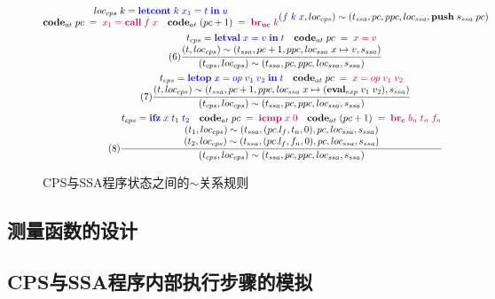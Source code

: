 \begin{figure}[htbp]
\begin{gather*}
{{\begin{matrix}
            loc_{cps}\; k = \textcolor{blue}{\mathbf{letcont}\; k\; x_1=t\; \mathbf{in}\; u}\\
            \mathbf{code}_{at}\; pc\; =\; \textcolor{purple}{x_1 = \mathbf{call}\; f\; x}\quad
            \mathbf{code}_{at}\; (pc+1)\; =\; \textcolor{purple}{\mathbf{br_{uc}}\; k} \end{matrix}}
            {(\textcolor{blue}{f\; k\; x},loc_{cps})\sim (t_{ssa},pc,ppc,loc_{ssa},\mathbf{push}\; s_{ssa}\; pc)}}  \\
        \tag{6} \displaystyle{\frac{\begin{matrix}
            t_{cps} = \textcolor{blue}{\mathbf{letval}\; x=v\; \mathbf{in}\; t} \quad
            \mathbf{code}_{at}\; pc\; =\; \textcolor{purple}{x = v} \\
            (t,loc_{cps})\sim (t_{ssa},pc+1,ppc,loc_{ssa}\; x\mapsto v,s_{ssa}) \end{matrix}}
            {(t_{cps},loc_{cps})\sim (t_{ssa},pc,ppc,loc_{ssa},s_{ssa})}}  \\
        \tag{7} \displaystyle{\frac{\begin{matrix}
            t_{cps} = \textcolor{blue}{\mathbf{letop}\; x=op\; v_1\; v_2\; \mathbf{in}\; t} \quad
            \mathbf{code}_{at}\; pc\; =\; \textcolor{purple}{x = op\; v_1\; v_2} \\
            (t,loc_{cps})\sim (t_{ssa},pc+1,ppc,loc_{ssa}\; x\mapsto (\mathbf{eval}_{exp}\; v_1\; v_2),s_{ssa}) \end{matrix}}
            {(t_{cps},loc_{cps})\sim (t_{ssa},pc,ppc,loc_{ssa},s_{ssa})}}  \\ 
        \tag{8} \displaystyle{\frac{\begin{matrix}
            t_{cps} = \textcolor{blue}{\mathbf{ifz}\; x\; t_1\; t_2} \quad
            \mathbf{code}_{at}\; pc\; =\; \textcolor{purple}{\mathbf{icmp}\; x\; 0} \quad
            \mathbf{code}_{at}\; (pc+1)\; =\; \textcolor{purple}{\mathbf{br_c}\; b_n\; t_n\; f_n} \\
            (t_1,loc_{cps})\sim (t_{ssa},(pc.l_f, t_n, 0),pc,loc_{ssa},s_{ssa}) \\
            (t_2,loc_{cps})\sim (t_{ssa},(pc.l_f, f_n, 0),pc,loc_{ssa},s_{ssa}) \end{matrix}}
            {(t_{cps},loc_{cps})\sim (t_{ssa},pc,ppc,loc_{ssa},s_{ssa})}}  \\          
    \end{gather*}
    \caption{CPS与SSA程序状态之间的$\sim$关系规则}\label{fig:simrelation}
\end{figure}

\subsection{测量函数的设计}

\subsection{CPS与SSA程序内部执行步骤的模拟}
